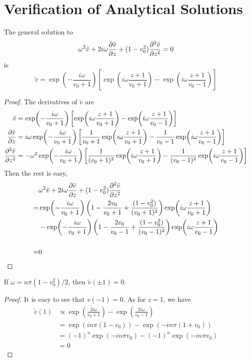\chapter{Verification of Analytical Solutions}
\begin{theorem}
    The general solution to
    \[
        \omega^2\tilde{v} + 2i\omega\pdv{\tilde{v}}{z} + (1-v_0^2)\pdv[2]{\tilde{v}}{z} = 0
    \]
    is
    \[
        \tilde{v} = \exp(-\frac{i\omega}{v_0+1})
        \left[ \exp(i\omega\frac{z+1}{v_0+1})
            - \exp(i\omega\frac{z+1}{v_0-1}) \right]
    \]
\end{theorem}
\begin{proof}
    The derivatives of $\tilde{v}$ are
    \begin{align*}
        \tilde{v}             & = \exp(-\frac{i\omega}{v_0+1})
        \left[ \exp(i\omega\frac{z+1}{v_0+1})
        - \exp(i\omega\frac{z+1}{v_0-1}) \right]                                                                     \\
        \pdv{\tilde{v}}{z}    & = i\omega\exp(-\frac{i\omega}{v_0+1})
        \left[ \frac{1}{v_0+1}\exp(i\omega\frac{z+1}{v_0+1}) - \frac{1}{v_0-1}\exp(i\omega\frac{z+1}{v_0-1}) \right] \\
        \pdv[2]{\tilde{v}}{z} & = -\omega^2\exp(-\frac{i\omega}{v_0+1})
        \left[ \frac{1}{(v_0+1)^2}\exp(i\omega\frac{z+1}{v_0+1}) - \frac{1}{(v_0-1)^2}\exp(i\omega\frac{z+1}{v_0-1}) \right]
    \end{align*}
    Then the rest is easy,
    \begin{align*}
          & \omega^2\tilde{v} + 2i\omega\pdv{\tilde{v}}{z} + (1-v_0^2)\pdv[2]{\tilde{v}}{z}                                            \\
        = & \exp(-\frac{i\omega}{v_0+1})
        \left(1-\frac{2v_0}{v_0+1} + \frac{(1-v_0^2)}{(v_0+1)^2}\right)\exp(i\omega\frac{z+1}{v_0+1})
        \\
          & -\exp(-\frac{i\omega}{v_0+1})\left(1-\frac{2v_0}{v_0-1} + \frac{(1-v_0^2)}{(v_0-1)^2}\right)\exp(i\omega\frac{z+1}{v_0-1}) \\
        \\
        = & 0
    \end{align*}
\end{proof}

\begin{theorem}
    If $\omega = n\pi(1-v_0^2)/2$, then $\tilde{v}(\pm 1) = 0$.
\end{theorem}
\begin{proof}
    It is easy to see that $v(-1)=0$. As for $z=1$, we have
    \begin{align*}
        \tilde{v}(1) & \propto
        \exp(\frac{2i\omega}{v_0+1}) - \exp(\frac{2i\omega}{v_0-1}) \\
                     & =
        \exp(in\pi(1-v_0)) - \exp(-in\pi(1+v_0))                    \\
                     & =
        (-1)^n\exp(-in\pi v_0) - (-1)^n\exp(-in\pi v_0)             \\
                     & = 0
    \end{align*}
\end{proof}

